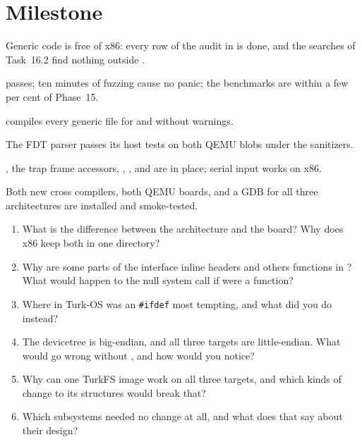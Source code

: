 \documentclass[11pt,a4paper]{article}
\begin{document}
\section{Milestone}

\begin{milestonebox}
\begin{checklist}
  \item Generic code is free of x86: every row of the audit in  is done, and the searches of
        Task~16.2 find nothing outside .
  \item {} passes; ten minutes of fuzzing cause no panic; the benchmarks are within a few
        per cent of Phase~15.
  \item {} compiles every generic file for  and  without warnings.
  \item The FDT parser passes its host tests on both QEMU blobs under the sanitizers.
  \item {}, the trap frame accessors, , ,
         and  are in place; serial input works on x86.
  \item Both new cross compilers, both QEMU boards,  and a GDB for all three architectures are installed and
        smoke-tested.
\end{checklist}
\end{milestonebox}

\begin{questionbox}
\begin{enumerate}
  \item What is the difference between the architecture and the board? Why does x86 keep both in one directory?
  \item Why are some parts of the interface inline headers and others functions in ? What would
        happen to the null system call if  were a function?
  \item Where in Turk-OS was an \texttt{\#ifdef} most tempting, and what did you do instead?
  \item The devicetree is big-endian, and all three targets are little-endian. What would go wrong without
        , and how would you notice?
  \item Why can one TurkFS image work on all three targets, and which kinds of change to its structures would break
        that?
  \item Which subsystems needed no change at all, and what does that say about their design?
\end{enumerate}
\end{questionbox}
\end{document}
